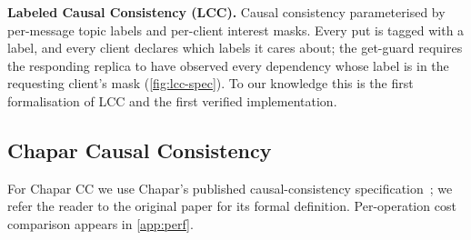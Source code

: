 \noindent\textbf{Labeled Causal Consistency (LCC).}
Causal consistency parameterised by per-message topic labels and per-client interest masks. Every put is tagged with a label, and every client declares which labels it cares about; the get-guard requires the responding replica to have observed every dependency whose label is in the requesting client's mask (\cref{fig:lcc-spec}). To our knowledge this is the first \coq{} formalisation of LCC and the first verified implementation.



\subsection{Chapar Causal Consistency}
For Chapar CC we use Chapar's published causal-consistency specification~\cite{chapar}; we refer the reader to the original paper for its formal definition. Per-operation cost comparison appears in \cref{app:perf}.
